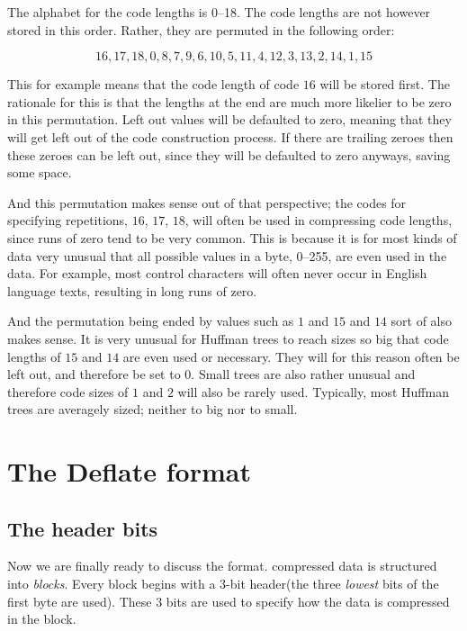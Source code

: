The alphabet for the code lengths is 0--18. The code lengths are not
however stored in this order. Rather, they are permuted in the
following order:

\begin{equation*}
  16, 17, 18, 0, 8, 7, 9, 6, 10, 5, 11, 4, 12, 3, 13, 2, 14, 1, 15
\end{equation*}

This for example means that the code length of code $16$ will be
stored first. The rationale for this is that the lengths at the end
are much more likelier to be zero in this permutation. Left out values
will be defaulted to zero, meaning that they will get left out of the
code construction process. If there are trailing zeroes then these
zeroes can be left out, since they will be defaulted to zero anyways,
saving some space.

And this permutation makes sense out of that perspective; the codes
for specifying repetitions, $16$, $17$, $18$, will often be used in
compressing code lengths, since runs of zero tend to be very
common. This is because it is for most kinds of data very unusual that
all possible values in a byte, 0--255, are even used in the data. For
example, most \ascii control characters will often never occur in
English language texts, resulting in long runs of zero.

And the permutation being ended by values such as $1$ and $15$ and
$14$ sort of also makes sense. It is very unusual for Huffman trees to
reach sizes so big that code lengths of $15$ and $14$ are even used or
necessary. They will for this reason often be left out, and therefore
be set to $0$. Small trees are also rather unusual and therefore code
sizes of $1$ and $2$ will also be rarely used. Typically, most Huffman
trees are averagely sized; neither to big nor to small.

\section{The Deflate format}

\subsection{The header bits}

Now we are finally ready to discuss the  format. 
compressed data is structured into \textit{blocks}. Every block begins
with a 3-bit header(the three \textit{lowest} bits of the first byte
are used). These 3 bits are used to specify how the data is compressed
in the block.

